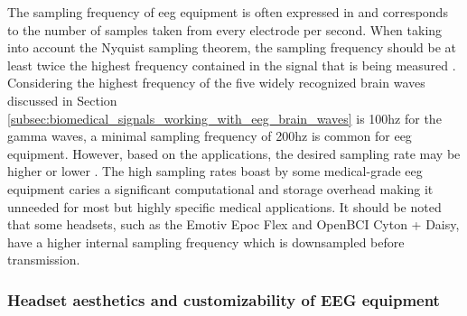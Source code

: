The sampling frequency of \gls{eeg} equipment is often expressed in  and corresponds to the number of samples taken from every electrode per second.
When taking into account the Nyquist sampling theorem, the sampling frequency should be at least twice the highest frequency contained in the signal that is being measured \citep{nyquist_theory}.
Considering the highest frequency of the five widely recognized brain waves discussed in Section \ref{subsec:biomedical_signals_working_with_eeg_brain_waves} is 100\gls{hz} for the gamma waves, a minimal sampling frequency of 200\gls{hz} is common for \gls{eeg} equipment.
However, based on the applications, the desired sampling rate may be higher or lower \citep{sampling_rate1, sampling_rate2}.
The high sampling rates boast by some medical-grade \gls{eeg} equipment caries a significant computational and storage overhead making it unneeded for most but highly specific medical applications.
It should be noted that some headsets, such as the Emotiv Epoc Flex and OpenBCI Cyton + Daisy, have a higher internal sampling frequency which is downsampled before transmission.



\subsubsection{Headset aesthetics and customizability of EEG equipment}
\label{subsubsec:biomedical_signals_measuring_brain_equipment_styling}

